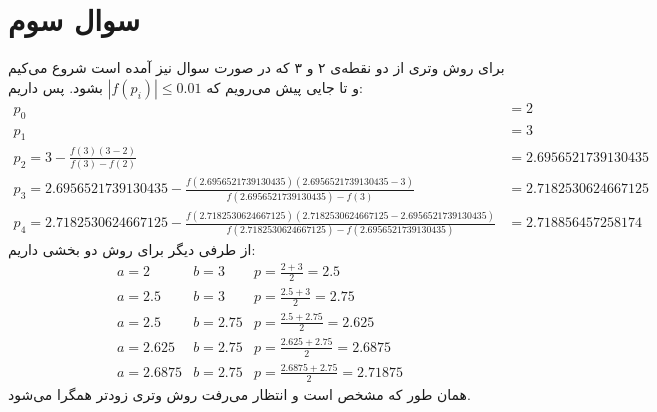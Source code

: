 \documentclass[]{article}
\begin{document}
\section*{سوال سوم}
برای روش وتری از دو نقطه‌ی ۲ و ۳ که در صورت سوال نیز آمده است شروع می‌کیم و تا جایی پیش می‌رویم که
$|f(p_i)| \le 0.01$
بشود. پس داریم:
\begin{align*}
    p_0 &= 2\\
    p_1 &= 3\\
    p_{2} = 3 - \frac{f(3) (3 - 2)}{f(3) - f(2)} &= 2.6956521739130435\\
    p_{3} = 2.6956521739130435 - \frac{f(2.6956521739130435) (2.6956521739130435 - 3)}{f(2.6956521739130435) - f(3)} &= 2.7182530624667125\\
    p_{4} = 2.7182530624667125 - \frac{f(2.7182530624667125) (2.7182530624667125 - 2.6956521739130435)}{f(2.7182530624667125) - f(2.6956521739130435)} &= \boxed{2.718856457258174}
\end{align*}
از طرفی دیگر برای روش دو بخشی داریم:
\[
\begin{array}{ccc}
    a = 2 & b = 3 & p = \frac{2 + 3}{2} = 2.5\\
    a = 2.5 & b = 3 & p = \frac{2.5 + 3}{2} = 2.75\\
    a = 2.5 & b = 2.75 & p = \frac{2.5 + 2.75}{2} = 2.625\\
    a = 2.625 & b = 2.75 & p = \frac{2.625 + 2.75}{2} = 2.6875\\
    a = 2.6875 & b = 2.75 & p = \frac{2.6875 + 2.75}{2} = \boxed{2.71875}
\end{array}
\]
همان طور که مشخص است و انتظار می‌رفت روش وتری زودتر همگرا می‌شود.
\end{document}

